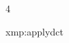 \documentclass[landscape, 8pt]{extarticle}
\begin{document}
\begin{multicols*}{4}
\begin{xmp}{xmp:applydct}{ }
		\end{xmp}
		
		
		
		
	\end{multicols*}
	
	
\end{document}
